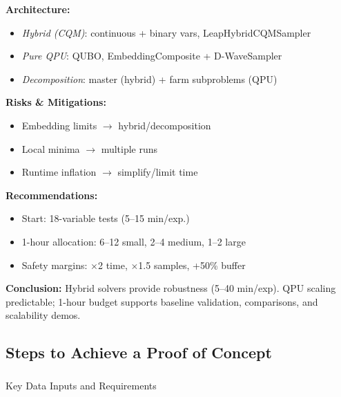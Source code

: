 \medskip
\textbf{Architecture:}
\begin{itemize}
    \item \emph{Hybrid (CQM)}: continuous + binary vars, LeapHybridCQMSampler
    \item \emph{Pure QPU}: QUBO, EmbeddingComposite + D-WaveSampler
    \item \emph{Decomposition}: master (hybrid) + farm subproblems (QPU)
\end{itemize}

\medskip
\textbf{Risks \& Mitigations:}
\begin{itemize}
    \item Embedding limits $\to$ hybrid/decomposition
    \item Local minima $\to$ multiple runs
    \item Runtime inflation $\to$ simplify/limit time
\end{itemize}

\medskip
\textbf{Recommendations:}
\begin{itemize}
    \item Start: 18-variable tests (5--15 min/exp.)
    \item 1-hour allocation: 6--12 small, 2--4 medium, 1--2 large
    \item Safety margins: $\times$2 time, $\times$1.5 samples, +50\% buffer
\end{itemize}

\medskip
\textbf{Conclusion:}  
Hybrid solvers provide robustness (5--40 min/exp). QPU scaling predictable; 1-hour budget supports baseline validation, comparisons, and scalability demos.



\subsection{Steps to Achieve a Proof of Concept}


\subsubsection{}{Key Data Inputs and Requirements}




